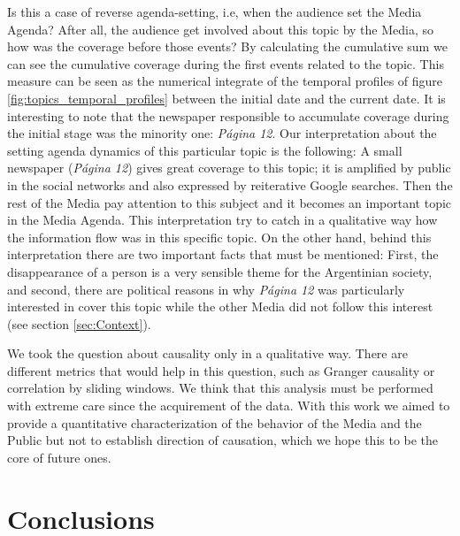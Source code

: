 \documentclass{bmcart}
\begin{document}
\par Is this a case of reverse agenda-setting, i.e, when the audience set the Media Agenda? 
After all,  the audience get involved about this topic by the Media, so how was the coverage before those events?
By calculating the cumulative sum we can see  the cumulative coverage during the first events related to the topic. 
This measure can be seen as the numerical integrate of the temporal profiles of figure \ref{fig:topics_temporal_profiles} between the initial date and the current date. 
It is interesting to note that the newspaper responsible to accumulate coverage during the initial stage was the minority one: \emph{P\'agina 12}. 
Our interpretation about the setting agenda dynamics of this particular topic is the following: A small newspaper (\emph{P\'agina 12}) gives great coverage to this topic; it is amplified  by public in the social networks and also expressed  by reiterative Google searches. Then the rest of the Media  pay attention to this subject and it becomes an important topic in the Media Agenda. 
This interpretation try to catch in a qualitative way how the information flow was in this specific topic.
On the other hand, behind this interpretation there are two important facts that must be mentioned: First, the disappearance of a person is a very sensible theme for the Argentinian society, and second, there are political reasons in why \emph{P\'agina 12} was particularly interested in cover this topic while the other Media did not follow this interest (see section \ref{sec:Context}).

\par We took the question about causality only in a qualitative way. 
There are different metrics that would help in this question, such as Granger causality or correlation by sliding windows. We think that this analysis must be performed with extreme care since the acquirement of the data.
With this work we aimed to provide a quantitative characterization of the behavior of the Media and the Public but not to establish direction of causation, which we hope this to be the core of future ones.

\section*{Conclusions}
\end{document}

